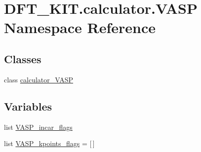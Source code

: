 \hypertarget{namespace_d_f_t___k_i_t_1_1calculator_1_1_v_a_s_p}{\section{D\+F\+T\+\_\+\+K\+I\+T.\+calculator.\+V\+A\+S\+P Namespace Reference}
\label{namespace_d_f_t___k_i_t_1_1calculator_1_1_v_a_s_p}
}
\subsection*{Classes}
\begin{DoxyCompactItemize}
\item 
class \hyperlink{class_d_f_t___k_i_t_1_1calculator_1_1_v_a_s_p_1_1calculator___v_a_s_p}{calculator\+\_\+\+V\+A\+S\+P}
\end{DoxyCompactItemize}
\subsection*{Variables}
\begin{DoxyCompactItemize}
\item 
list \hyperlink{namespace_d_f_t___k_i_t_1_1calculator_1_1_v_a_s_p_a7690ba9ed849d4f42c86ab05be97222d}{V\+A\+S\+P\+\_\+incar\+\_\+flags}
\item 
list \hyperlink{namespace_d_f_t___k_i_t_1_1calculator_1_1_v_a_s_p_a5f56b24ad81644827a028dd152578ba0}{V\+A\+S\+P\+\_\+kpoints\+\_\+flags} = \mbox{[}$\,$\mbox{]}
\end{DoxyCompactItemize}



